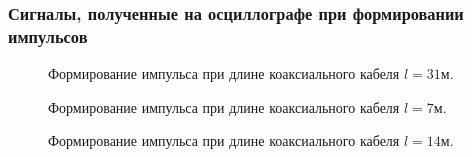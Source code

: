 \documentclass[12pt]{article}
\begin{document}
\begin{flushleft}
\subsubsection{Сигналы, полученные на осциллографе при формировании импульсов}
\begin{figure}[!h]
\caption{Формирование импульса при длине коаксиального кабеля $l=31$м.}
\label{ris:image}
\end{figure}
\begin{figure}[!h]
\caption{Формирование импульса при длине коаксиального кабеля $l=7$м.}
\label{ris:image}
\end{figure}
\begin{figure}[!h]
\caption{Формирование импульса при длине коаксиального кабеля $l=14$м.}
\label{ris:image}
\end{figure}

\end{flushleft}
\end{document}
